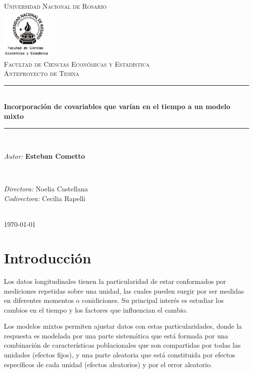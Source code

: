 \documentclass[spanish]{article}
\title{\thesistitle}
\author{\thesisauthorfirst\space\thesisauthorsecond}
\date{\thesisdate}
\numberwithin{figure}{subsection}
\numberwithin{equation}{subsection}
\numberwithin{table}{subsection}
\def\thesistitle{Incorporación de covariables que varían en el tiempo a un modelo mixto}
\def\thesisauthorfirst{\textbf{Esteban Cometto}}
\def\thesissupervisorfirst{Noelia Castellana}
\def\thesissupervisorsecond{Cecilia Rapelli}
\def\thesisdate{\today}
\begin{document}
\begin{titlepage}
    \newcommand{\HRule}{\rule{\linewidth}{0.5mm}}
	\center
	\textsc{\Large Universidad Nacional de Rosario}\\[.7cm]
	\includegraphics[width=25mm]{img/fceye-unr.png}\\[.5cm]
	\textsc{Facultad de Ciencias Económicas y Estadística}\\[0.5cm]
	\textsc{Anteproyecto de Tesina}
	
	\HRule \\[0.4cm]
	{ \huge \bfseries \thesistitle}\\[0.1cm]
	\HRule \\[.5cm]
	
	\begin{minipage}{0.6\textwidth}
	\large
	\textit{Autor:}	\thesisauthorfirst
	\end{minipage}
	\\[.6cm]
	\begin{minipage}{0.6\textwidth}
	\textit{Directora:} 	\thesissupervisorfirst \\[.2cm]
	\textit{Codirectora:} 	\thesissupervisorsecond
	\end{minipage}
	\\[4cm]
	\vfill
	{\large \thesisdate}\\
	\clearpage
\end{titlepage}

\newpage
\tableofcontents

\newpage
\section{Introducción}

Los datos longitudinales tienen la particularidad de estar conformados por
mediciones repetidas sobre una unidad, las cuales pueden surgir por ser medidas
en diferentes momentos o conidiciones. Su principal interés es estudiar los
cambios en el tiempo y los factores que influencian el cambio. 

Los modelos mixtos permiten ajustar datos con estas particularidades, donde la
respuesta es modelada por una parte sistemática que está formada por una
combinación de características poblacionales que son compartidas por todas las
unidades (efectos fijos), y una parte aleatoria que está constituida por
efectos específicos de cada unidad (efectos aleatorios) y por el error
aleatorio.
\end{document}
